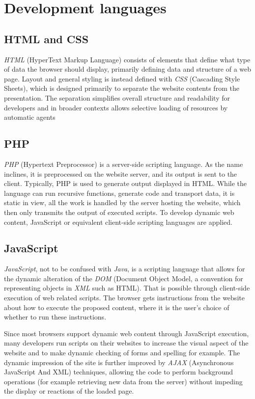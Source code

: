 \section{Development languages}
\subsection*{HTML and CSS}
\label{program_tools_html_css}
\emph{HTML} (HyperText Markup Language) consists of elements that define what type of data the browser should display, primarily defining data and structure of a web page. Layout and general styling is instead defined with \emph{CSS} (Cascading Style Sheets), which is designed primarily to separate the website contents from the presentation.
The separation simplifies overall structure and readability for developers and in broader contexts allows selective loading of resources by automatic agents\cite{html}\cite{css}

\subsection*{PHP}
\emph{PHP} (Hypertext Preprocessor) is a server-side scripting language. As the name inclines, it is preprocessed on the website server, and its output is sent to the client. Typically, PHP is used to generate output displayed in HTML. While the language can run recursive functions, generate code and transport data, it is static in view, all the work is handled by the server hosting the website, which then only transmits the output of executed scripts. To develop dynamic web content, JavaScript or equivalent client-side scripting languages are applied.\cite{php}

\subsection*{JavaScript}
\emph{JavaScript}, not to be confused with \emph{Java}, is a scripting language that allows for the dynamic alteration of the \emph{DOM} (Document Object Model, a convention for representing objects in \emph{XML} such as HTML). That is possible through client-side execution of web related scripts. The browser gets instructions from the website about how to execute the proposed content, where it is the user's choice of whether to run these instructions. \cite{javascript}

Since most browsers support dynamic web content through JavaScript execution, many developers run scripts on their websites to increase the visual aspect of the website and to make dynamic checking of forms and spelling for example\cite{javascript}. The dynamic impression of the site is further improved by \emph{AJAX} (Asynchronous JavaScript And XML) techniques, allowing the code to perform background operations (for example retrieving new data from the server) without impeding the display or reactions of the loaded page.

